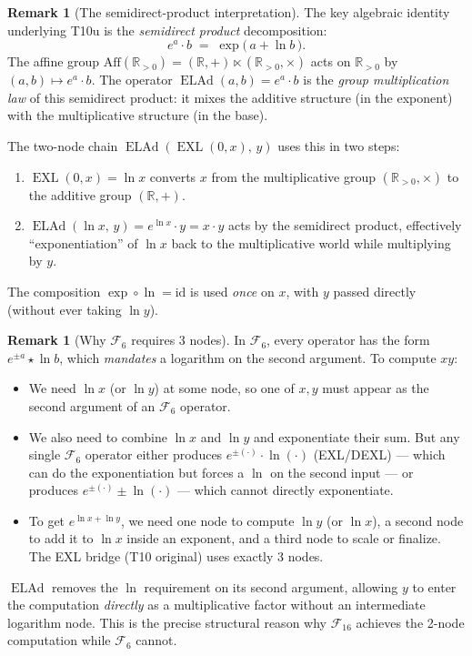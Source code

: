 \documentclass[12pt,a4paper]{article}
\theoremstyle{definition}
\newtheorem{remark}[theorem]{Remark}
\newcommand{\EXL}{\operatorname{EXL}}
\newcommand{\ELAd}{\operatorname{ELAd}}
\begin{document}
\begin{remark}[The semidirect-product interpretation]\label{rem:semidirect}
The key algebraic identity underlying T10u is the \emph{semidirect product}
decomposition:
\[
  e^{a} \cdot b \;=\; \exp\!\bigl(\,a + \ln b\,\bigr).
\]
The affine group $\mathrm{Aff}(\mathbb{R}_{>0}) = (\mathbb{R},+)\ltimes(\mathbb{R}_{>0},\times)$
acts on $\mathbb{R}_{>0}$ by $(a,b)\mapsto e^a\cdot b$.  The operator
$\ELAd(a,b)=e^a\cdot b$ is the \emph{group multiplication law} of this
semidirect product: it mixes the additive structure (in the exponent) with
the multiplicative structure (in the base).

The two-node chain $\ELAd(\EXL(0,x),\,y)$ uses this in two steps:
\begin{enumerate}
  \item $\EXL(0,x) = \ln x$ converts $x$ from the multiplicative group
        $(\mathbb{R}_{>0},\times)$ to the additive group $(\mathbb{R},+)$.
  \item $\ELAd(\ln x,\,y) = e^{\ln x}\cdot y = x\cdot y$ acts by the
        semidirect product, effectively ``exponentiation'' of $\ln x$ back
        to the multiplicative world while multiplying by $y$.
\end{enumerate}
The composition $\exp\circ\ln = \mathrm{id}$ is used \emph{once} on $x$,
with $y$ passed directly (without ever taking $\ln y$).
\end{remark}

\begin{remark}[Why $\mathcal{F}_6$ requires 3 nodes]\label{rem:F6obstacle}
In $\mathcal{F}_6$, every operator has the form $e^{\pm a}\star\ln b$,
which \emph{mandates} a logarithm on the second argument.  To compute $xy$:

\begin{itemize}
  \item We need $\ln x$ (or $\ln y$) at some node, so one of $x,y$ must
        appear as the second argument of an $\mathcal{F}_6$ operator.

  \item We also need to combine $\ln x$ and $\ln y$ and exponentiate their
        sum.  But any single $\mathcal{F}_6$ operator either produces
        $e^{\pm(\cdot)}\cdot\ln(\cdot)$ (EXL/DEXL) --- which can do the
        exponentiation but forces a $\ln$ on the second input --- or produces
        $e^{\pm(\cdot)}\pm\ln(\cdot)$ --- which cannot directly exponentiate.

  \item To get $e^{\ln x+\ln y}$, we need one node to compute $\ln y$
        (or $\ln x$), a second node to add it to $\ln x$ inside an exponent,
        and a third node to scale or finalize.  The EXL bridge (T10 original)
        uses exactly 3 nodes.
\end{itemize}

$\ELAd$ removes the $\ln$ requirement on its second argument, allowing $y$
to enter the computation \emph{directly} as a multiplicative factor without
an intermediate logarithm node.  This is the precise structural reason why
$\mathcal{F}_{16}$ achieves the 2-node computation while $\mathcal{F}_6$
cannot.
\end{remark}
\end{document}
